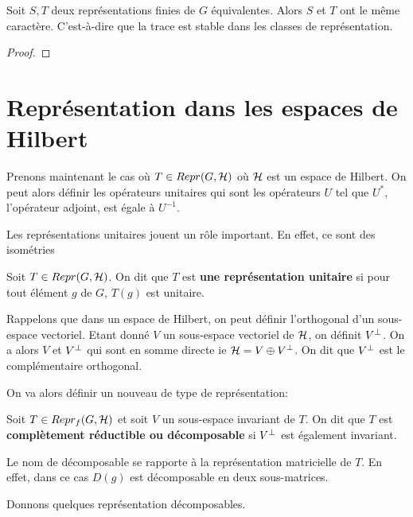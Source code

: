 \begin{proposition}
	Soit $S, T$ deux représentations finies de $G$ équivalentes. Alors $S$ et
	$T$ ont le même caractère. C'est-à-dire que la trace est stable dans les
	classes de représentation.
\end{proposition}

\begin{proof}
	
\end{proof}


\section{Représentation dans les espaces de Hilbert}

Prenons maintenant le cas où $T \in Repr(G, \mathcal{H})$ où $\mathcal{H}$ est un
espace de Hilbert.
On peut alors définir les opérateurs unitaires qui sont les opérateurs $U$ tel
que $U^{*}$, l'opérateur adjoint, est égale à $U^{-1}$.

Les représentations unitaires jouent un rôle important. En effet, ce sont des
isométries

\begin{definition}
	Soit $T \in Repr(G, \mathcal{H})$. On dit que $T$ est \textbf{une
	représentation unitaire} si pour tout élément $g$ de $G$, $T(g)$ est unitaire.
\end{definition}

Rappelons que dans un espace de Hilbert, on peut définir l'orthogonal d'un
sous-espace vectoriel. Etant donné $V$ un sous-espace vectoriel de $\mathcal{H}$,
on définit $V^{\perp}$. On a alors $V$ et $V^{\perp}$ qui sont en somme
directe ie $\mathcal{H} = V \oplus V^{\perp}$. On dit que $V^{\perp}$ est le
complémentaire orthogonal.

On va alors définir un nouveau de type de représentation:


\begin{definition}
	Soit $T \in Repr_{f}(G, \mathcal{H})$ et soit $V$ un sous-espace invariant de
	$T$.
	On dit que $T$ est \textbf{complètement réductible ou décomposable} si
	$V^{\perp}$ est également invariant.
\end{definition}

Le nom de décomposable se rapporte à la représentation matricielle de $T$. En
effet, dans ce cas $D(g)$ est décomposable en deux sous-matrices.


Donnons quelques représentation décomposables.

